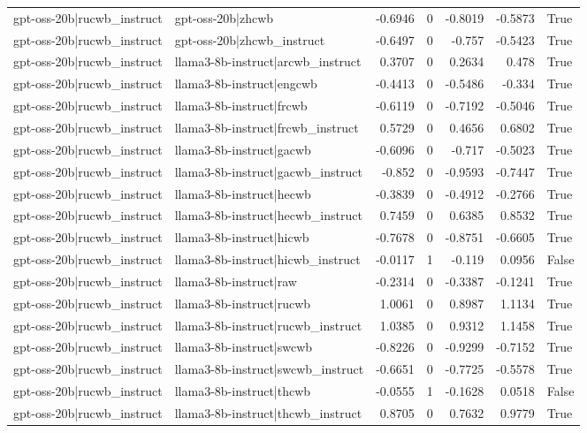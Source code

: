 \begin{table}
\begin{tabular}{l l r r r r l}
gpt-oss-20b|rucwb_instruct & gpt-oss-20b|zhcwb & -0.6946 & 0 & -0.8019 & -0.5873 & True \\
gpt-oss-20b|rucwb_instruct & gpt-oss-20b|zhcwb_instruct & -0.6497 & 0 & -0.757 & -0.5423 & True \\
gpt-oss-20b|rucwb_instruct & llama3-8b-instruct|arcwb_instruct & 0.3707 & 0 & 0.2634 & 0.478 & True \\
gpt-oss-20b|rucwb_instruct & llama3-8b-instruct|engcwb & -0.4413 & 0 & -0.5486 & -0.334 & True \\
gpt-oss-20b|rucwb_instruct & llama3-8b-instruct|frcwb & -0.6119 & 0 & -0.7192 & -0.5046 & True \\
gpt-oss-20b|rucwb_instruct & llama3-8b-instruct|frcwb_instruct & 0.5729 & 0 & 0.4656 & 0.6802 & True \\
gpt-oss-20b|rucwb_instruct & llama3-8b-instruct|gacwb & -0.6096 & 0 & -0.717 & -0.5023 & True \\
gpt-oss-20b|rucwb_instruct & llama3-8b-instruct|gacwb_instruct & -0.852 & 0 & -0.9593 & -0.7447 & True \\
gpt-oss-20b|rucwb_instruct & llama3-8b-instruct|hecwb & -0.3839 & 0 & -0.4912 & -0.2766 & True \\
gpt-oss-20b|rucwb_instruct & llama3-8b-instruct|hecwb_instruct & 0.7459 & 0 & 0.6385 & 0.8532 & True \\
gpt-oss-20b|rucwb_instruct & llama3-8b-instruct|hicwb & -0.7678 & 0 & -0.8751 & -0.6605 & True \\
gpt-oss-20b|rucwb_instruct & llama3-8b-instruct|hicwb_instruct & -0.0117 & 1 & -0.119 & 0.0956 & False \\
gpt-oss-20b|rucwb_instruct & llama3-8b-instruct|raw & -0.2314 & 0 & -0.3387 & -0.1241 & True \\
gpt-oss-20b|rucwb_instruct & llama3-8b-instruct|rucwb & 1.0061 & 0 & 0.8987 & 1.1134 & True \\
gpt-oss-20b|rucwb_instruct & llama3-8b-instruct|rucwb_instruct & 1.0385 & 0 & 0.9312 & 1.1458 & True \\
gpt-oss-20b|rucwb_instruct & llama3-8b-instruct|swcwb & -0.8226 & 0 & -0.9299 & -0.7152 & True \\
gpt-oss-20b|rucwb_instruct & llama3-8b-instruct|swcwb_instruct & -0.6651 & 0 & -0.7725 & -0.5578 & True \\
gpt-oss-20b|rucwb_instruct & llama3-8b-instruct|thcwb & -0.0555 & 1 & -0.1628 & 0.0518 & False \\
gpt-oss-20b|rucwb_instruct & llama3-8b-instruct|thcwb_instruct & 0.8705 & 0 & 0.7632 & 0.9779 & True \\

\end{tabular}
\end{table}
